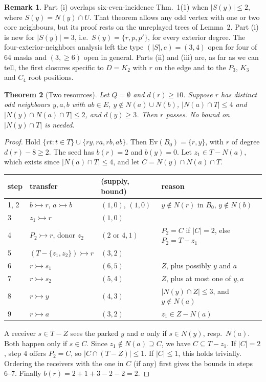 \documentclass[11pt]{amsart}
\newtheorem{theorem}{Theorem}[section]
\theoremstyle{definition}
\newtheorem{remark}[theorem]{Remark}
\newcommand{\Ev}{\mathrm{Ev}}
\newcommand{\tr}{\rightarrowtail}   %
\begin{document}
\begin{remark}
Part (i) overlaps six-even-incidence Thm.~1(1) when $|S(y)|\le2$, where $S(y)=N(y)\cap U$. That
theorem allows any odd vertex with one or two core neighbours, but its proof rests on the
unreplayed trees of Lemma~2. Part (i) is new for $|S(y)|=3$, i.e.\ $S(y)=\{r,p,p'\}$, for every
exterior degree. The four-exterior-neighbors analysis left the type $(|S|,e)=(3,4)$ open for four of
64 masks and $(3,\ge6)$ open in general. Parts (ii) and (iii) are, as far as we can tell, the first
closures specific to $D=K_2$ with $r$ on the edge and to the $P_3$, $K_3$ and $C_4$ root positions.
\end{remark}

\begin{theorem}[Two resources]\label{thm:tworesources}
Let $Q=\emptyset$ and $d(r)\ge10$. Suppose $r$ has distinct odd neighbours $y,a,b$ with $ab\in E$,
$y\notin N(a)\cup N(b)$, $|N(a)\cap T|\le4$ and $|N(y)\cap N(a)\cap T|\le2$, and $d(y)\ge3$. Then
$r$ passes. No bound on $|N(y)\cap T|$ is needed.
\end{theorem}
\begin{proof}
Hold $\{rt:t\in T\}\cup\{ry,ra,rb,ab\}$. Then $\Ev(B_0)=\{r,y\}$, with $r$ of degree
$d(r)-8\ge2$. The seed has $b(r)=2$ and $b(y)=0$. Let $z_1\in T-N(a)$, which exists since
$|N(a)\cap T|\le4$, and let $C=N(y)\cap N(a)\cap T$.

\begin{center}\small
\begin{tabular}{llll}
\toprule
step & transfer & (supply, bound) & reason\\
\midrule
1, 2 & $b\tr r$, $a\tr b$ & $(1,0)$, $(1,0)$ & $y\notin N(r)$ in $B_0$, $y\notin N(b)$\\
3 & $z_1\tr r$ & $(1,0)$ & \\
4 & $P_2\tr r$, donor $z_2$ & $(2\text{ or }4,1)$ & $P_2=C$ if $|C|=2$, else $P_2=T-z_1$\\
5 & $(T-\{z_1,z_2\})\tr r$ & $(3,2)$ & \\
6 & $r\tr s_1$ & $(6,5)$ & $Z$, plus possibly $y$ and $a$\\
7 & $r\tr s_2$ & $(5,4)$ & $Z$, plus at most one of $y,a$\\
8 & $r\tr y$ & $(4,3)$ & $|N(y)\cap Z|\le3$, and $y\notin N(a)$\\
9 & $r\tr a$ & $(3,2)$ & $z_1\in Z-N(a)$\\
\bottomrule
\end{tabular}
\end{center}

A receiver $s\in T-Z$ sees the parked $y$ and $a$ only if $s\in N(y)$, resp.\ $N(a)$. Both happen
only if $s\in C$. Since $z_1\notin N(a)\supseteq C$, we have $C\subseteq T-z_1$. If $|C|=2$,
step 4 offers $P_2=C$, so $|C\cap(T-Z)|\le1$. If $|C|\le1$, this holds trivially. Ordering the
receivers with the one in $C$ (if any) first gives the bounds in steps 6--7. Finally
$b(r)=2+1+3-2-2=2$.
\end{proof}
\end{document}
